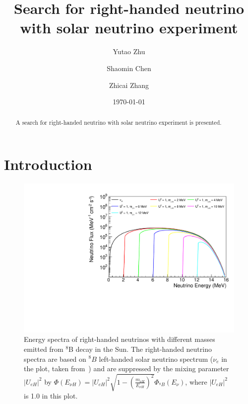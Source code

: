 \documentclass[%
 reprint,
 amsmath,amssymb,
 aps,
 prd,
twocolumn,
]{revtex4-1}
\begin{document}

\title{Search for right-handed neutrino with solar neutrino experiment}%

\author{Yutao Zhu}
\author{Shaomin Chen}
\author{Zhicai Zhang}%
%

\date{\today}

\begin{abstract}
A search for right-handed neutrino with solar neutrino experiment is presented.
\end{abstract}

\maketitle

\section{\label{sec:intro}  Introduction }

\clearpage

\begin{figure}[!ht]
\includegraphics[width=0.99\columnwidth]{../plots/RHNSpectrum_U1.0_AllMass_linXlogY.pdf}
\caption{Energy spectra of right-handed neutrinos with different masses emitted from $^8$B decay in the Sun. The right-handed neutrino spectra are based on $^8B$ left-handed solar neutrino spectrum ($\nu_e$ in the plot, taken from~\cite{bahcall1996B8Spectrum}) and are suppressed by the mixing parameter $|U_{eH}|^2$ by $\Phi(E_{\nu H}) = |U_{eH}|^2\sqrt{1-(\frac{m_{\nu H}}{E_{\nu H}})^2}\Phi_{^8B}(E_{\nu})$, where $|U_{eH}|^2$ is 1.0 in this plot.}
\label{fig:RHNSpectrum} 
\end{figure}
\end{document}

